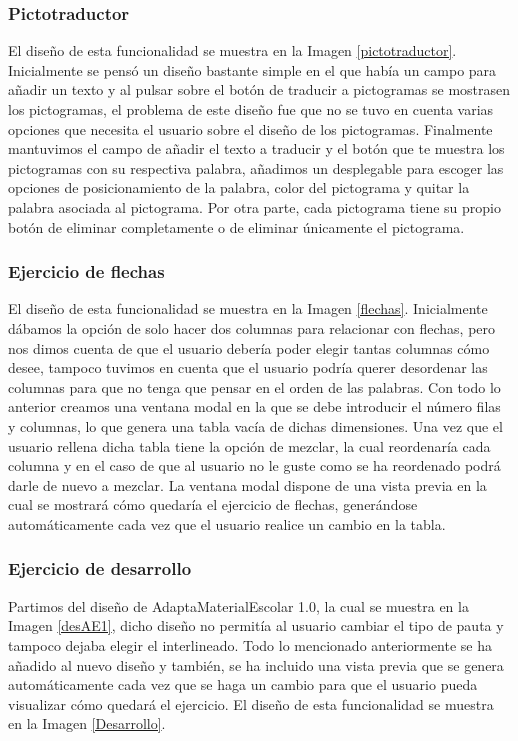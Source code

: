 \subsubsection{Pictotraductor}
El diseño de esta funcionalidad se muestra en la Imagen \ref{pictotraductor}. Inicialmente se pensó un diseño bastante simple en el que había un campo para añadir un texto y al pulsar sobre el botón de traducir a pictogramas se mostrasen los pictogramas, el problema de este diseño fue que no se tuvo en cuenta varias opciones que necesita el usuario sobre el diseño de los pictogramas. Finalmente mantuvimos el campo de añadir el texto a traducir y el botón que te muestra los pictogramas con su respectiva palabra, añadimos un desplegable para escoger las opciones de posicionamiento de la palabra, color del pictograma y quitar la palabra asociada al pictograma. Por otra parte, cada pictograma tiene su propio botón de eliminar completamente o de eliminar únicamente el pictograma. 

\subsubsection{Ejercicio de flechas}
El diseño de esta funcionalidad se muestra en la Imagen \ref{flechas}. Inicialmente dábamos la opción de solo hacer dos columnas para relacionar con flechas, pero nos dimos cuenta de que el usuario debería poder elegir tantas columnas cómo desee, tampoco tuvimos en cuenta que el usuario podría querer desordenar las columnas para que no tenga que pensar en el orden de las palabras. Con todo lo anterior creamos una ventana modal en la que se debe introducir el número filas y columnas, lo que genera una tabla vacía de dichas dimensiones. Una vez que el usuario rellena dicha tabla tiene la opción de mezclar, la cual reordenaría cada columna y en el caso de que al usuario no le guste como se ha reordenado podrá darle de nuevo a mezclar. La ventana modal dispone de una vista previa en la cual se mostrará cómo quedaría el ejercicio de flechas, generándose automáticamente cada vez que el usuario realice un cambio en la tabla. 

\subsubsection{Ejercicio de desarrollo}
 Partimos del diseño de AdaptaMaterialEscolar 1.0, la cual se muestra en la Imagen \ref{desAE1}, dicho diseño no permitía al usuario cambiar el tipo de pauta y tampoco dejaba elegir el interlineado. Todo lo mencionado anteriormente se ha añadido al nuevo diseño y también, se ha incluido una vista previa que se genera automáticamente cada vez que se haga un cambio para que el usuario pueda visualizar cómo quedará el ejercicio. El diseño de esta funcionalidad se muestra en la Imagen \ref{Desarrollo}.    

